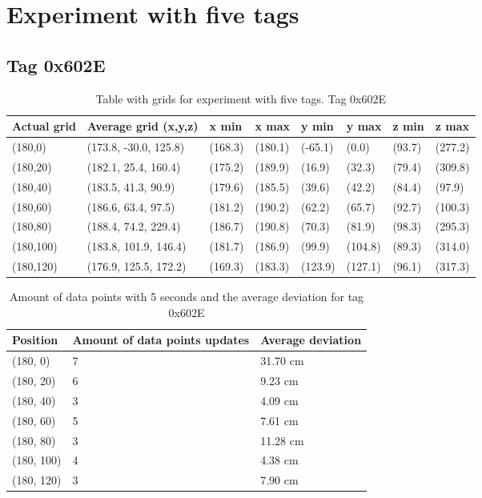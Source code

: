 \section*{Experiment with five tags}
\subsection{Tag 0x602E}
\begin{table}[H]
    \begin{tabular}{|l|l|l|l|l|l|l|l|}
        \hline
        Actual grid & Average grid (x,y,z)  & x min   & x max   & y min   & y max   & z min  & z max   \\ \hline
        (180,0)     & (173.8, -30.0, 125.8) & (168.3) & (180.1) & (-65.1) & (0.0)   & (93.7) & (277.2) \\ \hline
        (180,20)    & (182.1, 25.4, 160.4)  & (175.2) & (189.9) & (16.9)  & (32.3)  & (79.4) & (309.8) \\ \hline
        (180,40)    & (183.5, 41.3, 90.9)   & (179.6) & (185.5) & (39.6)  & (42.2)  & (84.4) & (97.9)  \\ \hline
        (180,60)    & (186.6, 63.4, 97.5)   & (181.2) & (190.2) & (62.2)  & (65.7)  & (92.7) & (100.3) \\ \hline
        (180,80)    & (188.4, 74.2, 229.4)  & (186.7) & (190.8) & (70.3)  & (81.9)  & (98.3) & (295.3) \\ \hline
        (180,100)   & (183.8, 101.9, 146.4) & (181.7) & (186.9) & (99.9)  & (104.8) & (89.3) & (314.0) \\ \hline
        (180,120)   & (176.9, 125.5, 172.2) & (169.3) & (183.3) & (123.9) & (127.1) & (96.1) & (317.3) \\ \hline
    \end{tabular}
    \caption{Table with grids for experiment with five tags. Tag 0x602E}
\end{table}

\begin{table}[H]
    \centering
    \begin{tabular}{|l|l|l|}
        \hline
        Position   & Amount of data points updates & Average deviation \\ \hline
        (180, 0)   & 7                             & 31.70 cm          \\ \hline
        (180, 20)  & 6                             & 9.23 cm           \\ \hline
        (180, 40)  & 3                             & 4.09 cm           \\ \hline
        (180, 60)  & 5                             & 7.61 cm           \\ \hline
        (180, 80)  & 3                             & 11.28 cm          \\ \hline
        (180, 100) & 4                             & 4.38 cm           \\ \hline
        (180, 120) & 3                             & 7.90 cm           \\ \hline
    \end{tabular}
    \caption{Amount of data points with 5 seconds and the average deviation for tag 0x602E}
\end{table}

